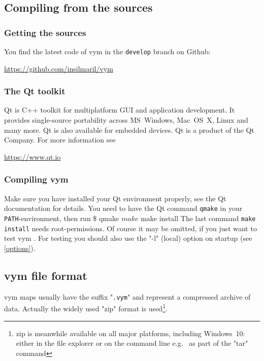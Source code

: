 \documentclass[12pt,a4paper]{article}
\newcommand{\vym}{{\sc vym }}
\newenvironment{code}[1] { \verbatim #1}{\endverbatim  }
\begin{document}
\begin{appendix}
\subsection{Compiling from the sources}
\subsubsection{Getting the sources} \label{getsources}
You find the latest code of \vym in the {\tt develop} branch on Github:
\begin{center}
    \href{ https://github.com/insilmaril/vym}{https://github.com/insilmaril/vym}
\end{center}

\subsubsection{The Qt toolkit}
Qt is C++ toolkit for multiplatform GUI and application development. It
provides single-source portability across MS~Windows, Mac~OS~X, Linux
and many more. Qt is also available for
embedded devices. Qt is a product of the Qt Company. For more information see
\begin{center} 
    \href{https://www.qt.io}{https://www.qt.io} 
\end{center}



\subsubsection{Compiling \vym }
Make sure you have installed your Qt environment properly, see the Qt
documentation for details. You need to have the Qt command {\tt qmake}
in your {\tt PATH}-environment, then run
\begin{code}
\$ qmake
$ make  
$ make install
\end{code}
The last command {\tt make install} needs root-permissions. Of course it
may be omitted, if you just want to test \vym. For testing you should
also use the "-l" (local) option on startup (see \ref{options}).


\subsection{\vym file format} \label{fileformat}
\vym maps usually have the suffix "{\tt .vym}" and represent a
compressed archive of data. Actually the widely used "zip" format
is used\footnote{zip is meanwhile available on all major platforms,
including Windows~10: either in the file explorer or on the command line
e.g.~ as part of the "tar" command}.


\end{appendix}
\end{document}
